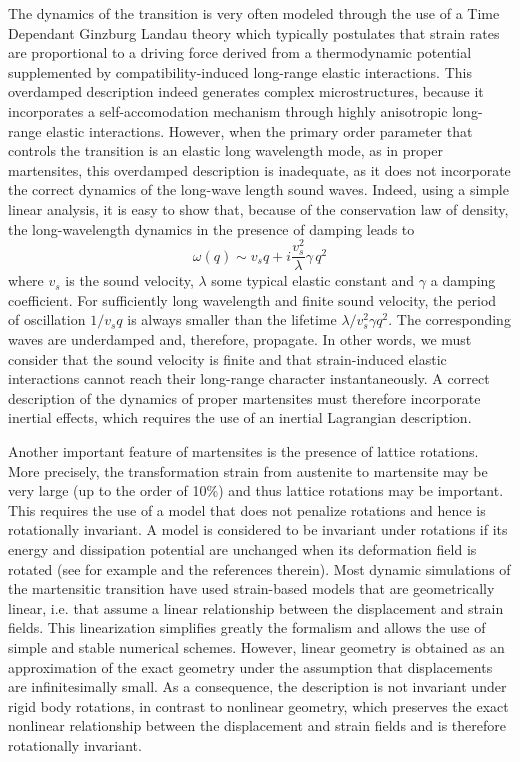 \documentclass[twocolumn,amsmath,amssymb]{revtex4}
\begin{document}
The dynamics of the transition is very often modeled through the use of a Time Dependant Ginzburg Landau theory which typically postulates that strain rates are proportional to a driving force derived from a thermodynamic potential supplemented by compatibility-induced long-range elastic interactions. This overdamped description indeed generates complex microstructures, because it incorporates a self-accomodation mechanism through highly anisotropic long-range elastic interactions. However, when the primary order parameter that controls the transition is an elastic long wavelength mode, as in proper martensites, this overdamped description is inadequate, as it does not incorporate the correct dynamics of the long-wave length sound waves. Indeed, using a simple linear analysis, it is easy to show that, because of the conservation law of density,  the long-wavelength dynamics in the presence of damping leads to
%
\begin{equation}
\omega(q) \sim v_s q + i\frac{v_s^2}{\lambda} \gamma\, q^2
\end{equation}
%
where $v_s$ is the sound velocity, $\lambda$ some typical elastic constant and $\gamma$ a damping coefficient. For sufficiently long wavelength and finite sound velocity, the period of oscillation $1/v_s q$ is always smaller than the lifetime $\lambda/v_s^2\gamma q^2$. The corresponding waves are underdamped and, therefore, propagate. In other words, we must consider that the sound velocity is finite and that strain-induced elastic interactions cannot reach their long-range character instantaneously. A correct description of the dynamics of proper martensites must therefore incorporate inertial effects, which requires the use of an inertial Lagrangian description.

Another important feature of martensites is the presence of lattice rotations. More precisely, the transformation strain from austenite to martensite may be very large (up to the order of 10\%) and thus lattice rotations may be important. This requires the use of a model that does not penalize rotations and  hence is  rotationally invariant. A model is considered to be invariant under rotations if its energy and dissipation potential are unchanged when its deformation field is rotated (see for example \cite{Ant05,Dem00} and the references therein). Most dynamic simulations of the martensitic transition have used strain-based models that are geometrically linear, i.e. that assume a linear relationship between the displacement and strain fields. This linearization simplifies greatly the  formalism and allows the use of simple and stable numerical schemes. However, linear geometry is obtained as an approximation of the exact geometry  under the assumption that displacements are infinitesimally small. As a consequence, the description is not invariant under rigid body rotations, in contrast to nonlinear geometry, which preserves the exact nonlinear relationship between the displacement and strain fields and is therefore rotationally invariant. 
\end{document}
